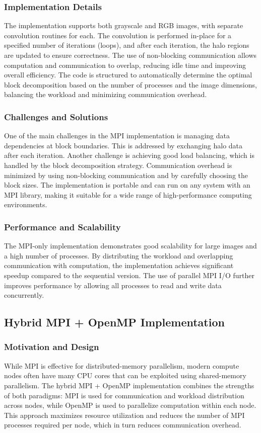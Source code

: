 \documentclass[conference, 10pt]{IEEEtran}
\begin{document}
\subsubsection{Implementation Details}
The implementation supports both grayscale and RGB images, with separate convolution routines for each. The convolution is performed in-place for a specified number of iterations (loops), and after each iteration, the halo regions are updated to ensure correctness. The use of non-blocking communication allows computation and communication to overlap, reducing idle time and improving overall efficiency. The code is structured to automatically determine the optimal block decomposition based on the number of processes and the image dimensions, balancing the workload and minimizing communication overhead.

\subsubsection{Challenges and Solutions}
One of the main challenges in the MPI implementation is managing data dependencies at block boundaries. This is addressed by exchanging halo data after each iteration. Another challenge is achieving good load balancing, which is handled by the block decomposition strategy. Communication overhead is minimized by using non-blocking communication and by carefully choosing the block sizes. The implementation is portable and can run on any system with an MPI library, making it suitable for a wide range of high-performance computing environments.

\subsubsection{Performance and Scalability}
The MPI-only implementation demonstrates good scalability for large images and a high number of processes. By distributing the workload and overlapping communication with computation, the implementation achieves significant speedup compared to the sequential version. The use of parallel MPI I/O further improves performance by allowing all processes to read and write data concurrently.

\subsection{Hybrid MPI + OpenMP Implementation}
\subsubsection{Motivation and Design}
While MPI is effective for distributed-memory parallelism, modern compute nodes often have many CPU cores that can be exploited using shared-memory parallelism. The hybrid MPI + OpenMP implementation combines the strengths of both paradigms: MPI is used for communication and workload distribution across nodes, while OpenMP is used to parallelize computation within each node. This approach maximizes resource utilization and reduces the number of MPI processes required per node, which in turn reduces communication overhead.
\end{document}
